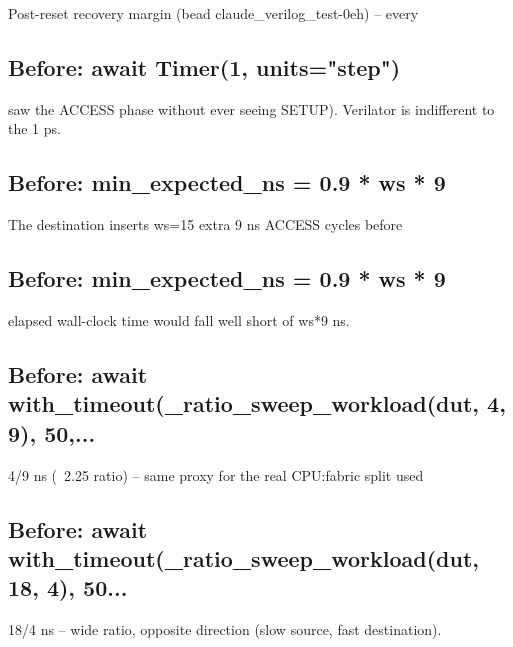 \begin{record}
\begin{textblock}
Post-reset recovery margin (bead claude_verilog_test-0eh) -- every
\end{textblock}

\subsection*{Before: await Timer(1, units="step")}

\begin{textblock}
saw the ACCESS phase without ever seeing SETUP).  Verilator is indifferent to the 1 ps.
\end{textblock}

\subsection*{Before: min\_expected\_ns = 0.9 * ws * 9}

\begin{textblock}
The destination inserts ws=15 extra 9 ns ACCESS cycles before
\end{textblock}

\subsection*{Before: min\_expected\_ns = 0.9 * ws * 9}

\begin{textblock}
elapsed wall-clock time would fall well short of ws*9 ns.
\end{textblock}

\subsection*{Before: await with\_timeout(\_ratio\_sweep\_workload(dut, 4, 9), 50,...}

\begin{textblock}
4/9 ns (~2.25 ratio) -- same proxy for the real CPU:fabric split used
\end{textblock}

\subsection*{Before: await with\_timeout(\_ratio\_sweep\_workload(dut, 18, 4), 50...}

\begin{textblock}
18/4 ns -- wide ratio, opposite direction (slow source, fast destination).
\end{textblock}


\end{record}
